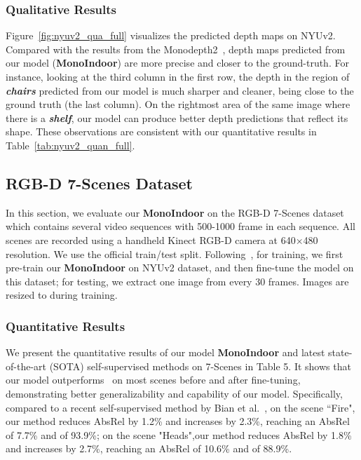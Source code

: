 \subsubsection{Qualitative Results}

Figure~\ref{fig:nyuv2_qua_full} visualizes the predicted depth maps on NYUv2. Compared with the results from the Monodepth2~\cite{godard2019digging}, depth maps predicted from our model (\textbf{MonoIndoor}) are more precise and closer to the ground-truth. For instance, looking at the third column in the first row, the depth in the region of \textbf{\textit{chairs}} predicted from our model is much sharper and cleaner, 
being close to the ground truth (the last column). On the rightmost area of the same image where there is a \textbf{\textit{shelf}}, our model can produce better depth predictions that reflect its shape. These observations are consistent with our quantitative results in Table~\ref{tab:nyuv2_quan_full}.


\subsection{RGB-D 7-Scenes Dataset}
In this section, we evaluate our \textbf{MonoIndoor} on the RGB-D 7-Scenes dataset \cite{Shotton_2013_CVPR} which contains several video sequences with 500-1000 frame in each sequence. All scenes are recorded using a handheld Kinect RGB-D camera at 640×480 resolution. We use the official train/test split. Following~\cite{bian2020unsupervised}, for training, we first pre-train our \textbf{MonoIndoor} on NYUv2 dataset, and then fine-tune the model on this dataset; for testing, we extract one image from every 30 frames. Images are resized to  during training.

\subsubsection{Quantitative Results}

We present the quantitative results of our model \textbf{MonoIndoor} and latest state-of-the-art (SOTA) self-supervised methods on 7-Scenes in Table 5. It shows that our model outperforms~\cite{bian2020unsupervised} on most scenes before and after fine-tuning, demonstrating better generalizability and capability of our model. Specifically, compared to a recent self-supervised method by Bian et al.~\cite{bian2020unsupervised}, on the scene ``Fire", our method reduces AbsRel by 1.2\% and increases  by 2.3\%, reaching an AbsRel of 7.7\% and  of 93.9\%; on the scene "Heads",our method reduces AbsRel by 1.8\% and increases  by 2.7\%, reaching an AbsRel of 10.6\% and  of 88.9\%.

